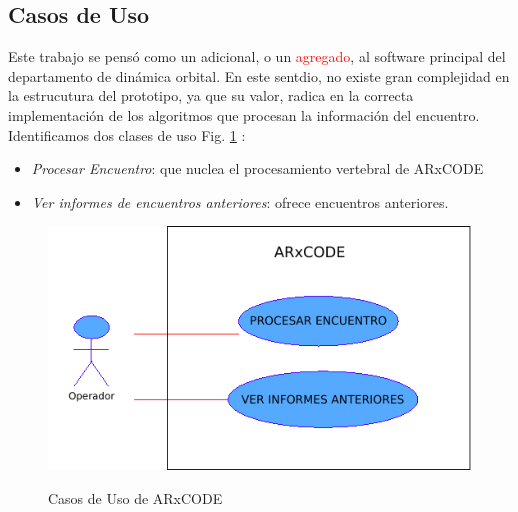 \subsection{Casos de Uso}

Este trabajo se pens\'o como un adicional, o un \textcolor{red}{agregado}, al software principal del departamento de din\'amica orbital. En este sentdio, no existe gran complejidad en la estrucutura del prototipo, ya que su valor, radica en la correcta implementaci\'on de los algoritmos que procesan la informaci\'on del encuentro.\\
Identificamos dos clases de uso Fig. \ref{fig:casosuso} :\\
\begin{itemize}
 \item {\it{Procesar Encuentro}}: que nuclea el procesamiento vertebral de ARxCODE
 \item {\it{Ver informes de encuentros anteriores}}: ofrece encuentros anteriores.
\end{itemize}

\begin{figure}[h!]
  \centering
  \includegraphics[width=.5\textwidth]{imagenes/usecaseAR}
  \label{fig:casosuso}
  \caption{Casos de Uso de ARxCODE}
\end{figure}


